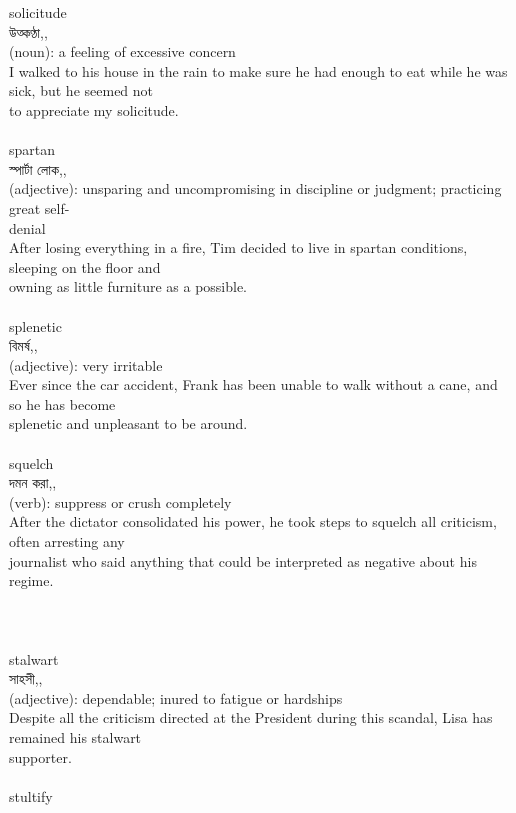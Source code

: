 \documentclass{article}
\begin{document}
{{solicitude}\\
{উত্কণ্ঠা,,}\\
{(noun): a feeling of excessive concern\\I walked to his house in the rain to make sure he had enough to eat while he was sick, but he seemed not\\to appreciate my solicitude.\\}\\
{spartan}\\
{স্পার্টা লোক,,}\\
{(adjective): unsparing and uncompromising in discipline or judgment; practicing great self-\\denial\\After losing everything in a fire, Tim decided to live in spartan conditions, sleeping on the floor and\\owning as little furniture as a possible.\\}\\
{splenetic}\\
{বিমর্ষ,,}\\
{(adjective): very irritable\\Ever since the car accident, Frank has been unable to walk without a cane, and so he has become\\splenetic and unpleasant to be around.\\}\\
{squelch}\\
{দমন করা,,}\\
{(verb): suppress or crush completely\\After the dictator consolidated his power, he took steps to squelch all criticism, often arresting any\\journalist who said anything that could be interpreted as negative about his regime.\\\\                                                                                \\}\\
{stalwart}\\
{সাহসী,,}\\
{(adjective): dependable; inured to fatigue or hardships\\Despite all the criticism directed at the President during this scandal, Lisa has remained his stalwart\\supporter.\\}\\
{stultify}\\
}
\end{document}
